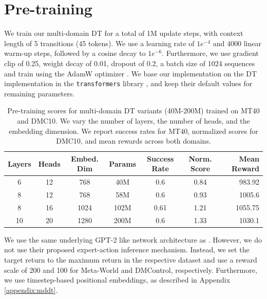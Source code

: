 \section{Pre-training}\label{appendix:pre-training}
We train our multi-domain DT for a total of 1M update steps, with context length of 5 transitions (45 tokens). We use a learning rate of $1e^{-4}$ and 4000 linear warm-up steps, followed by a cosine decay to $1e^{-6}$. Furthermore, we use gradient clip of 0.25, weight decay of 0.01, dropout of 0.2, a batch size of 1024 sequences and train using the AdamW optimizer \citep{Loshchilov:18}. We base our implementation on the DT implementation in the \texttt{transformers} library \citep{Wolf:20}, and keep their default values for remaining parameters.

\begin{table}[]
    \centering
    \caption{Pre-training scores for multi-domain DT variants (40M-200M) trained on MT40 and DMC10. We vary the number of layers, the number of heads, and the embedding dimension. We report success rates for MT40, normalized scores for DMC10, and mean rewards across both domains.}
    \begin{tabular}{c c c c c  c r}
    \toprule
     \textbf{Layers} &  \textbf{Heads} &  \textbf{Embed. Dim} & \textbf{Params} & \textbf{Success Rate} & \textbf{Norm. Score} & \textbf{Mean Reward} \\
    \midrule
      6 &     12 &            768 &  40M  &   0.6 &   0.84 &  983.92 \\
      8 &     12 &            768 &  58M   &    0.6 &   0.93  &  1005.6  \\
      8 &     16 &           1024 &  102M   &   0.61 &   1.21  & 1055.75 \\
      10 &     20 &           1280 &  200M   &   0.6 &   1.33  &  1030.1\\
    \bottomrule
    \end{tabular}
    \label{tab:appendix-pretrain}
\end{table}

We use the same underlying GPT-2 like network architecture as \citet{Lee:22}. However, we do not use their proposed expert-action inference mechanism. Instead, we set the target return to the maximum return in the respective dataset and use a reward scale of 200 and 100 for Meta-World and DMControl, respectively. Furthermore, we use timestep-based positional embeddings, as described in Appendix \ref{appendix:mddt}.

